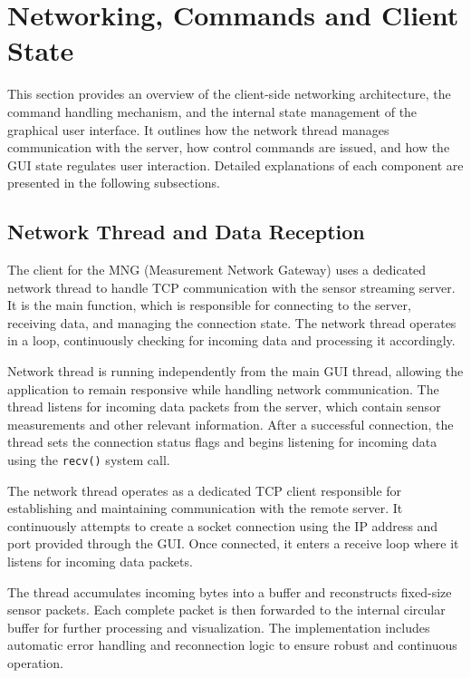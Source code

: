 \section{Networking, Commands and Client State}
This section provides an overview of the client-side networking architecture, the command handling mechanism, and the internal state management of the graphical user interface. It outlines how the network thread manages communication with the server, how control commands are issued, and how the GUI state regulates user interaction. Detailed explanations of each component are presented in the following subsections.

\subsection{Network Thread and Data Reception}
The client for the MNG (Measurement Network Gateway) uses a dedicated network thread to handle TCP communication with the sensor streaming server. It is the main function, which is responsible for connecting to the server, receiving data, and managing the connection state. The network thread operates in a loop, continuously checking for incoming data and processing it accordingly.

Network thread is running independently from the main GUI thread, allowing the application to remain responsive while handling network communication. The thread listens for incoming data packets from the server, which contain sensor measurements and other relevant information. After a successful connection, the thread sets the connection status flags and begins listening for incoming data using the \texttt{recv()} system call.

The network thread operates as a dedicated TCP client responsible for establishing and maintaining communication with the remote server. It continuously attempts to create a socket connection using the IP address and port provided through the GUI. Once connected, it enters a receive loop where it listens for incoming data packets.

The thread accumulates incoming bytes into a buffer and reconstructs fixed-size sensor packets. Each complete packet is then forwarded to the internal circular buffer for further processing and visualization. The implementation includes automatic error handling and reconnection logic to ensure robust and continuous operation.

